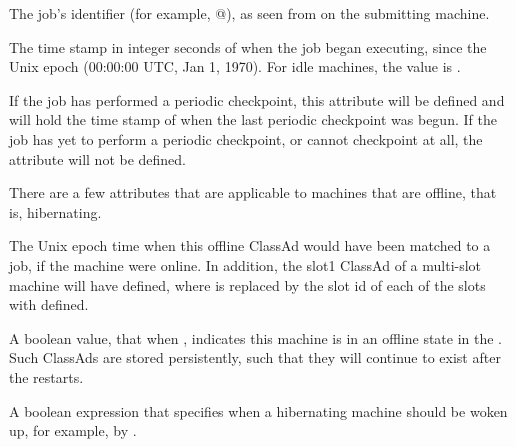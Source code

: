 \begin{description}

\item[\AdAttr{JobId}:] The job's identifier (for example,
@), as seen from 
on the submitting machine.

\item[\AdAttr{JobStart}:] The time stamp in integer seconds of when the job began
executing, since the Unix epoch (00:00:00 UTC, Jan 1, 1970).  For idle
machines, the value is .

\item[\AdAttr{LastPeriodicCheckpoint}:] If the job has performed a
periodic checkpoint, this attribute will be defined and will hold the
time stamp of when the last periodic checkpoint was begun.
If the job has yet to perform a periodic checkpoint, or cannot
checkpoint at all, the  attribute will
not be defined.

\end{description}

There are a few attributes that are applicable to machines that
are offline, that is, hibernating.

\begin{description}

\item[\AdAttr{MachineLastMatchTime}:] The Unix epoch time when this offline 
ClassAd
would have been matched to a job, if the machine were online.  
In addition,
the slot1 ClassAd of a multi-slot machine will have 
 defined,
where  is replaced by the slot id of each of the slots
with  defined.

\item[\AdAttr{Offline}:] A boolean value, that when ,
indicates this machine is in an offline state in the .
Such ClassAds are stored persistently, 
such that they will continue to exist after the  restarts.

\item[\AdAttr{Unhibernate}:] A boolean expression that specifies when
a hibernating machine should be woken up, for example, by .

\end{description}

